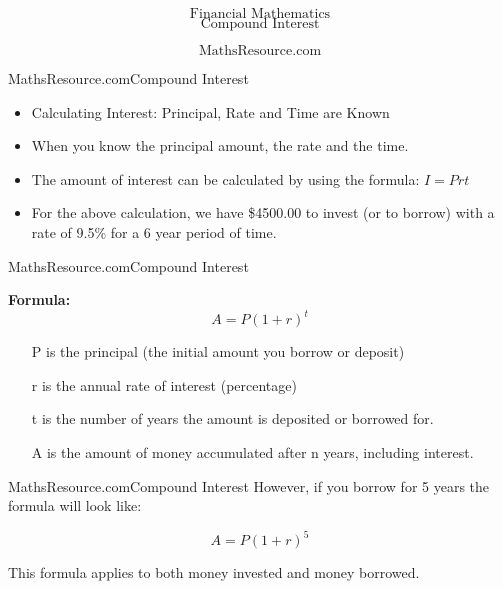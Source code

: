 \documentclass{beamer}
\begin{document}
\begin{frame}
\Huge
\[\mbox{Financial Mathematics}\]
\LARGE
\[\mbox{Compound Interest}\]

\Large
\[\mbox{MathsResource.com}\]


\end{frame}


\begin{frame}{MathsResource.com}{Compound Interest}
\Large
\begin{itemize}
\item Calculating Interest: Principal, Rate and Time are Known
\item 
When you know the principal amount, the rate and the time. 

\item The amount of interest can be calculated by using the formula:
$I = Prt$
\item 
For the above calculation, we have \$4500.00 to invest (or to borrow) with a rate of 9.5\% for a 6 year period of time.
\end{itemize}
\end{frame}
\begin{frame}{MathsResource.com}{Compound Interest}
\Large

\textbf{Formula:}
\[ A= P(1 + r)^t \]

\begin{itemize}
\item[P] is the principal (the initial amount you borrow or deposit)
\item[r] is the annual rate of interest (percentage)
\item[t] is the number of years the amount is deposited or borrowed for.
\item[A] is the amount of money accumulated after n years, including interest.
\end{itemize}



\end{frame}
\begin{frame}{MathsResource.com}{Compound Interest}
\Large
\vspace{-1cm}
However, if you borrow for 5 years the formula will look like:

\[ A = P(1 + r)^5 \]

This formula applies to both money invested and money borrowed.

\end{frame}
\end{document}
